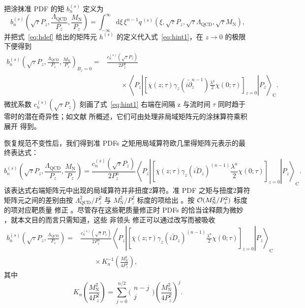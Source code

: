 把涂抹准 PDF 的矩 $b_n^{(s)}$ 定义为
\begin{equation}\label{eq:bdef}
b_n^{(s)}\left(\sqrt{\tau}P_z,\frac{\Lambda_{\mathrm{QCD}}}{P_z},
\frac{M_\mathrm{N}}{P_z}\right)
= \int_{-\infty}^\infty
\mathrm{d}\xi\, \xi^{n-1}
q^{\,(s)}\left(\xi,\sqrt{\tau}P_z,\sqrt{\tau}\Lambda_{\mathrm{QCD}},\sqrt{\tau}
M_\mathrm{N}\right),
\end{equation}
并把式~\eqref{eq:hdef} 给出的矩阵元 $h^{(s)}$ 的定义代入式~\eqref{eq:hint1}，在
$z\rightarrow 0$ 的极限下便得到
\begin{align}
b_n^{(s)}\left( \sqrt{\tau}P_z,\frac{\Lambda_{\mathrm{QCD}}}{P_z},
\frac{M_\mathrm{N}}{P_z}\right)_{B_z=0}
= {} & \frac{c_n^{(s)}(\sqrt{\tau}P_z)}{2P_z^n} \nonumber\\
{} & \qquad \times \left\langle
P_z \left| \left[\overline{\chi}(z;\tau) \gamma_z
\left(i\overleftarrow{\partial}_z^{n-1}\right)\frac{\lambda^a}{2}
\chi(0;\tau)\right ] _{z=0 } \right|P_z\right\rangle_\mathrm{C}.
\end{align}
微扰系数 $c_n^{(s)}(\sqrt{\tau}P_z)$ 刻画了式~\eqref{eq:hint1} 右端在间隔 z 与流时间 $\tau$ 同时趋于零时的潜在奇异性；如文献
\cite{Lin:2014zya} 所概述，它们可由处理非局域矩阵元的涂抹算符乘积展开
\cite{Monahan:2015lha} 得到。

恢复规范不变性后，我们得到准 PDFs 之矩用局域算符欧几里得矩阵元表示的最终表达式：
\begin{equation}
b_n^{(s)} \left(\sqrt{\tau}P_z,\frac{\Lambda_{\mathrm{QCD}}}{P_z},
\frac{M_\mathrm{N}}{P_z}\right)
=\frac{c_n^{(s)}(\sqrt{\tau}P_z)}{2P_z^n}\left\langle
P_z \left| \left[
\overline{\chi}(z;\tau)\gamma_z (i\overleftarrow{D}_z)^{(n-1)}
\frac{\lambda^a}{2}\chi(0;\tau) \right ] _{z=0 }
\right|P_z\right\rangle_\mathrm{C} .
\end{equation}
该表达式右端矩阵元中出现的局域算符并非扭度2算符。准 PDF 之矩与扭度2算符矩阵元之间的差别由按
$\Lambda_\mathrm{QCD}^2/{P_z^2}$
与 $M_\mathrm{N}^2/P_z^2$ 标度的项给出 \cite{Lin:2014zya,Alexandrou:2015rja}。按 ${\cal O}(M_\mathrm{N}^2/P_z^2)$ 标度的项对应靶质量
修正 \cite{Nachtmann:1973ll,Georgi:1974sr}。尽管存在这些靶质量修正时 PDFs 的恰当诠释颇为微妙
\cite{Steffens:2012jx,Monfared:2014nta}，就本文目的而言只需知道，这些
非领头
修正可以通过改写而被吸收
\cite{Lin:2014zya,Alexandrou:2015rja}
\begin{align}
b_n^{(s)} \left(\sqrt{\tau}P_z,\frac{\Lambda_{\mathrm{QCD}}}{P_z}\right)
= {} & \frac{c_n^{(s)}(\sqrt{\tau}P_z)}{2P_z^n}\left\langle
P_z \left|\left[
\overline{\chi}(z;\tau)\gamma_z (i\overleftarrow{D}_z)^{(n-1)}
\frac{\lambda^a}{2}\chi(0;\tau) \right ] _{z=0 }
\right|P_z\right\rangle_\mathrm{C} \nonumber \\
{} & \qquad \times K_n^{-1}\left(\frac{M_\mathrm{N}^2}{4P_z^2}\right),
\end{align}
其中
\begin{equation}
K_n\left(\frac{M_\mathrm{N}^2}{4P_z^2}\right) = \sum_{j=0}^{n/2}
\bigg(
\begin{array}{c}
n-j \\
j
\end{array}
\bigg)
\left(\frac{M_\mathrm{N}^2}{4P_z^2}\right)^j.
\end{equation}

